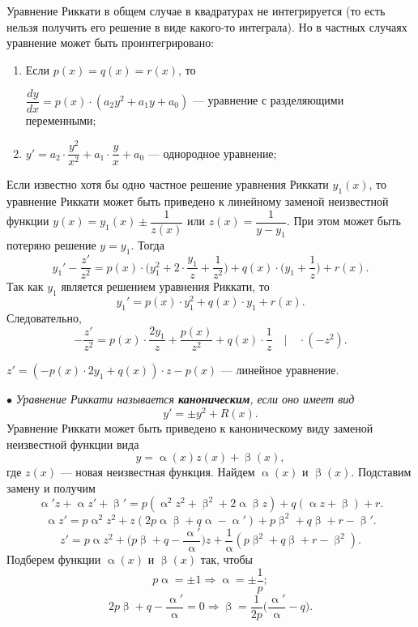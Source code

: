 \documentclass[a4paper, 12pt]{report}
\renewcommand{\alpha}{\upalpha}
\renewcommand{\beta}{\upbeta}
\begin{document}
Уравнение Риккати в общем случае в квадратурах не интегрируется (то есть нельзя получить его решение в виде какого-то интеграла). Но в частных случаях уравнение может быть проинтегрировано:
\begin{enumerate}
	\item Если $p(x) = q(x) = r(x)$, то \begin{center}
		$\dfrac{dy}{dx} = p(x)\cdot (a_2y^2 +a_1y + a_0)$ --- уравнение с разделяющими переменными;
	\end{center} 
\item \begin{center}
	$y' = a_2\cdot \dfrac{y^2}{x^2} +a_1\cdot \dfrac{y}{x} + a_0$ --- однородное уравнение;
\end{center}
\end{enumerate}
Если известно хотя бы одно частное решение уравнения Риккати $y_1(x)$, то уравнение Риккати может быть приведено к линейному заменой неизвестной функции $y(x) = y_1(x) \pm \dfrac{1}{z(x)}$ или $z(x) = \dfrac{1}{y - y_1}$. При этом может быть потеряно решение $y = y_1$. Тогда $$y_1' - \dfrac{z'}{z^2} = p(x)\cdot \Big(y_1^2 + 2\cdot\dfrac{y_1}{z} + \dfrac{1}{z^2}\Big) + q(x)\cdot\Big(y_1 + \dfrac{1}{z}\Big) +r(x).$$
Так как $y_1$ является решением уравнения Риккати, то $$y_1' = p(x)\cdot y_1^2 + q(x)\cdot y_1 + r(x).$$
Следовательно, $$-\dfrac{z'}{z^2} = p(x)\cdot \dfrac{2y_1}{z} + \dfrac{p(x)}{z^2} + q(x)\cdot \dfrac{1}{z} \quad \Big|\quad \cdot (-z^2).$$
\begin{center}
	$z' = (-p(x)\cdot 2 y_1 + q(x))\cdot z - p(x)$ --- линейное уравнение.
\end{center}
$\bullet$ \textit{Уравнение Риккати называется \textbf{каноническим}, если оно имеет вид} $$y' = \pm y^2 + R(x).$$
Уравнение Риккати может быть приведено к каноническому виду заменой неизвестной функции вида $$y = \alpha (x)z (x) + \beta (x),$$
где $z(x)$ --- новая неизвестная функция. Найдем $\alpha(x)$ и $\beta (x)$. Подставим замену и получим
$$\alpha ' z + \alpha z' + \beta' = p(\alpha ^2 z^2 + \beta ^2 + 2\alpha \beta z) + q(\alpha z + \beta ) + r.$$
$$\alpha z' = p\alpha^2z^2 + z(2p\alpha\beta + q\alpha - \alpha') + p\beta^2 + q\beta + r - \beta'.$$
$$z' = p\alpha z^2 + \Big(p\beta + q - \dfrac{\alpha '}{\alpha }\Big)z + \dfrac{1}{\alpha} (p\beta^2 + q\beta + r - \beta ^2).$$
Подберем функции $\alpha(x)$ и $\beta (x)$ так, чтобы $$p\alpha = \pm 1\Rightarrow \alpha = \pm \dfrac{1}{p};$$
$$2p\beta + q -\dfrac{\alpha '}{\alpha } = 0\Rightarrow\beta = \dfrac{1}{2p}\Big(\dfrac{\alpha '}{\alpha} - q\Big).$$
\end{document}
